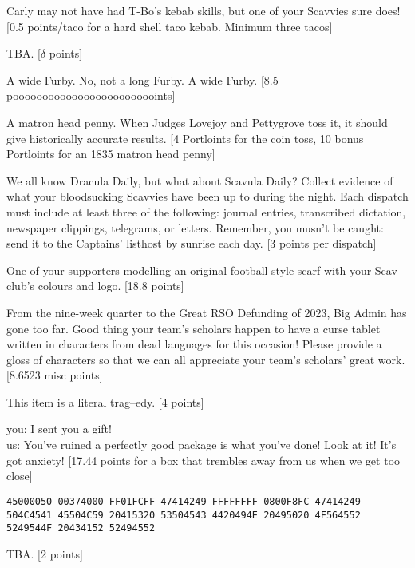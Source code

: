 \documentclass{book}
\begin{document}
\begin{list}{}{}
\item Carly may not have had T-Bo's kebab skills, but one of your Scavvies sure does! [0.5 points/taco for a hard shell taco kebab. Minimum three tacos]  %
\item TBA. [$\delta$ points] %
\item A wide Furby. No, not a long Furby. A wide Furby. [8.5 pooooooooooooooooooooooooints]
\item A matron head penny. When Judges Lovejoy and Pettygrove toss it, it should give historically accurate results. [4 Portloints for the coin toss, 10 bonus Portloints for an 1835 matron head penny]
\item We all know Dracula Daily, but what about Scavula Daily? Collect evidence of what your bloodsucking Scavvies have been up to during the night. Each dispatch must include at least three of the following: journal entries, transcribed dictation, newspaper clippings, telegrams, or letters. Remember, you musn't be caught: send it to the Captains' listhost by sunrise each day. [3 points per dispatch]
\item One of your supporters modelling an original football-style scarf with your Scav club's colours and logo. [18.8 points]
\item From the nine-week quarter to the Great RSO Defunding of 2023, Big Admin has gone too far. Good thing your team's scholars happen to have a curse tablet written in characters from dead languages for this occasion! Please provide a gloss of characters so that we can all appreciate your team's scholars' great work. [8.6523 misc points]
\item This item is a literal trag--\newline edy. [4 points]
\item you: I sent you a gift! \\
us: You’ve ruined a perfectly good package is what you’ve done! Look at it! It’s got anxiety! [17.44 points for a box that trembles away from us when we get too close]
\item \texttt{45000050 00374000 FF01FCFF 47414249 \newline
	FFFFFFFF 0800F8FC 47414249 504C4541  45504C59 20415320 53504543  4420494E 20495020 4F564552  5249544F 20434152 52494552} \newline
[8.0.0.0 IPoints]
\item TBA. [2 points] %

\end{list}
\end{document}
